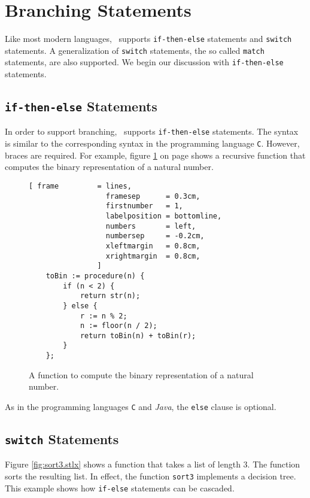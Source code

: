 \section{Branching Statements}
Like most modern languages, \setlx\ supports \texttt{if-then-else} statements and
\texttt{switch} statements.  A generalization of \texttt{switch} statements, the so called
\texttt{match} statements, are also supported. We begin our discussion with
\texttt{if-then-else} statements.

\subsection{\texttt{if-then-else} Statements}
In order to support branching, \setlx\ supports \texttt{if-then-else} statements.  The syntax is 
similar to the corresponding syntax in the programming language \texttt{C}.  However, braces are
required.  For example, figure \ref{fig:toBin.stlx} on page \pageref{fig:toBin.stlx} shows a
recursive function that computes the binary representation of a natural number.  

\begin{figure}[!ht]
\centering
\begin{Verbatim}[ frame         = lines, 
                  framesep      = 0.3cm, 
                  firstnumber   = 1,
                  labelposition = bottomline,
                  numbers       = left,
                  numbersep     = -0.2cm,
                  xleftmargin   = 0.8cm,
                  xrightmargin  = 0.8cm,
                ]
    toBin := procedure(n) {
        if (n < 2) {
            return str(n);
        } else {
            r := n % 2;
            n := floor(n / 2);
            return toBin(n) + toBin(r);
        }
    };
\end{Verbatim}
\vspace*{-0.3cm}
\caption{A function to compute the binary representation of a natural number.}
\label{fig:toBin.stlx}
\end{figure}

As in the programming languages \texttt{C} and \textsl{Java}, the \texttt{else} clause is optional.

\subsection{\texttt{switch} Statements}
Figure \ref{fig:sort3.stlx} shows a function that takes a list of length 3.  The function sorts
the resulting list.  In effect, the function \texttt{sort3} implements a decision tree.
This example shows how \texttt{if-else} statements can be cascaded.

